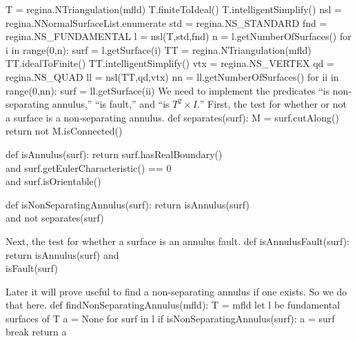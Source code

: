 \documentclass[10pt,twocolumn]{article}%
\theoremstyle{definition}
\begin{document}
\nwendcode{}\endmoddef\nwstartdeflinemarkup\nwenddeflinemarkup
T = regina.NTriangulation(mfld)
T.finiteToIdeal()
T.intelligentSimplify()
\nwendcode{}\endmoddef\nwstartdeflinemarkup\nwenddeflinemarkup
nsl = regina.NNormalSurfaceList.enumerate
std = regina.NS_STANDARD
fnd = regina.NS_FUNDAMENTAL
l = nsl(T,std,fnd)
\nwendcode{}\endmoddef\nwstartdeflinemarkup\nwenddeflinemarkup
n = l.getNumberOfSurfaces()
for i in range(0,n):
  surf = l.getSurface(i)
\nwendcode{}\endmoddef\nwstartdeflinemarkup\nwenddeflinemarkup
TT = regina.NTriangulation(mfld)
TT.idealToFinite()
TT.intelligentSimplify()
\nwendcode{}\endmoddef\nwstartdeflinemarkup\nwenddeflinemarkup
vtx = regina.NS_VERTEX
qd  = regina.NS_QUAD
ll = nsl(TT,qd,vtx)
\nwendcode{}\endmoddef\nwstartdeflinemarkup\nwenddeflinemarkup
nn = ll.getNumberOfSurfaces()
for ii in range(0,nn):
  surf = ll.getSurface(ii)
\nwendcode{}\nwdocspar
We need to implement the predicates
``is non-separating annulus,''
``is fault,'' and ``is $T^2 \times I.$''
\nwenddocs{}\nwdocspar
First, the test for whether or not
a surface is a non-separating annulus.
\nwenddocs{}\endmoddef\nwstartdeflinemarkup\nwenddeflinemarkup
def separates(surf):
  M = surf.cutAlong()
  return not M.isConnected()

def isAnnulus(surf):
  return surf.hasRealBoundary()            \\
    and surf.getEulerCharacteristic() == 0 \\
    and surf.isOrientable()

def isNonSeparatingAnnulus(surf):
  return isAnnulus(surf) \\
     and not separates(surf)

\nwendcode{}\nwdocspar
Next, the test for whether a surface
is an annulus fault.
\nwenddocs{}\endmoddef\nwstartdeflinemarkup\nwenddeflinemarkup
def isAnnulusFault(surf):
  return isAnnulus(surf) and \\
         isFault(surf)

\nwendcode{}\nwdocspar
Later it will prove useful
to find a non-separating annulus
if one exists. So we do that here.
\nwenddocs{}\endmoddef\nwstartdeflinemarkup\nwenddeflinemarkup
def findNonSeparatingAnnulus(mfld):
  T = mfld
  \LA{}let l be fundamental surfaces of T\RA{}
  a = None
  \LA{}for surf in l\RA{}
    if isNonSeparatingAnnulus(surf):
      a = surf
      break
  return a
\end{document}
